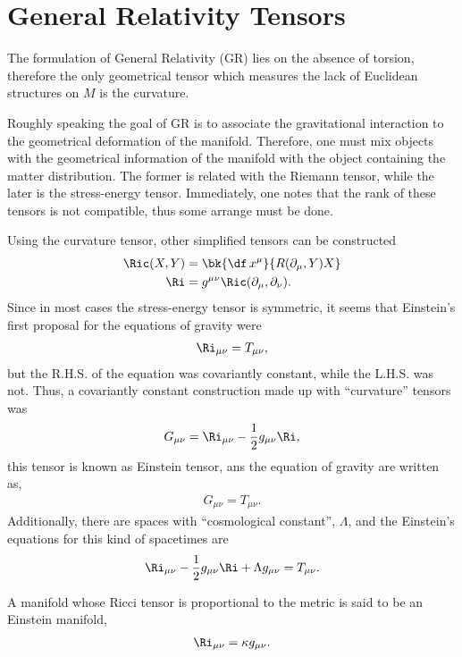 \section{General Relativity Tensors}

The formulation of General Relativity (GR) lies on the absence of torsion, therefore the only geometrical tensor which measures the lack of Euclidean structures on $M$ is the curvature.

Roughly speaking the goal of GR is to associate the gravitational interaction to the geometrical deformation of the manifold. Therefore, one must mix objects with the geometrical information of the manifold with the object containing the matter distribution. The former is related with the Riemann tensor, while the later is the stress-energy tensor. Immediately, one notes that the rank of these tensors is not compatible, thus some arrange must be done.

Using the curvature tensor, other simplified tensors can be constructed
\begin{align}
  \Ric(X,Y) &= \bk{\df\, x^\mu}{R(\partial_\mu,Y)X}\\
  \Ri &= g^{\mu \nu}\Ric(\partial_\mu,\partial_\nu).
\end{align}
Since in most cases the stress-energy tensor is symmetric, it seems that Einstein's first proposal for the equations of gravity were
\begin{align}
  \Ri_{\mu\nu}=T_{\mu\nu},
\end{align}
but the R.H.S. of the equation was covariantly constant, while the L.H.S. was not. Thus, a covariantly constant construction made up with ``curvature'' tensors was
\begin{align}
  G_{\mu\nu} = \Ri_{\mu\nu}-\frac{1}{2}g_{\mu\nu}\Ri,
\end{align}
this tensor is known as Einstein tensor, ans the equation of gravity are written as,
\begin{align}
  G_{\mu\nu}= T_{\mu\nu}.
\end{align}
Additionally, there are spaces with ``cosmological constant'', $\Lambda$, and the Einstein's equations for this kind of spacetimes are
\begin{align}
  \Ri_{\mu\nu}-\frac{1}{2}g_{\mu\nu}\Ri + \Lambda g_{\mu\nu}= T_{\mu\nu}.
\end{align}

A manifold whose Ricci tensor is proportional to the metric is said to be an Einstein manifold,
\begin{align}
  \Ri_{\mu\nu} = \kappa g_{\mu\nu}.\label{def-const-curv}
\end{align}

